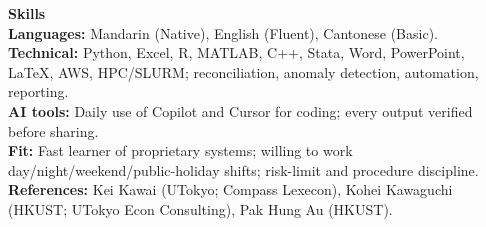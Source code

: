 \documentclass[11pt,letterpaper]{article}
\begin{document}
\vspace{0.15pt}

{\large \textbf{Skills}}\\[-0.5pt]
\textbf{Languages:} Mandarin (Native), English (Fluent), Cantonese (Basic).\\
\textbf{Technical:} Python, Excel, R, MATLAB, C++, Stata, Word, PowerPoint, \LaTeX, AWS, HPC/SLURM; reconciliation, anomaly detection, automation, reporting.\\
\textbf{AI tools:} Daily use of Copilot and Cursor for coding; every output verified before sharing.\\
\textbf{Fit:} Fast learner of proprietary systems; willing to work day/night/weekend/public-holiday shifts; risk-limit and procedure discipline.\\
\textbf{References:} Kei Kawai (UTokyo; Compass Lexecon), Kohei Kawaguchi (HKUST; UTokyo Econ Consulting), Pak Hung Au (HKUST).
\end{document}
